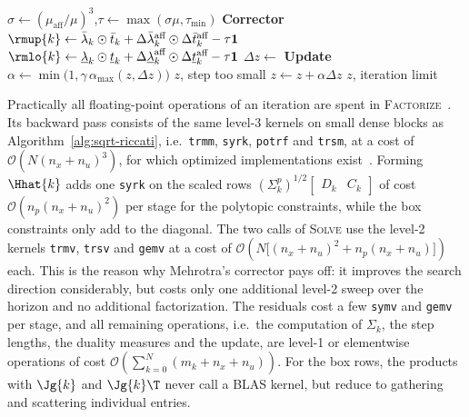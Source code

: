 \begin{algorithm}[H]
\begin{algorithmic}[1]
\State $\sigma \gets (\mu_{\text{aff}} / \mu)^3$,\quad $\tau \gets \max(\sigma\mu, \tau_{\min})$
\Statex \hspace{\algorithmicindent}\textbf{Corrector}
\State $\rmup{k} \gets \bar{\lambda}_k \odot \bar{t}_k + \Delta\bar{\lambda}_k^{\text{aff}} \odot \Delta\bar{t}_k^{\text{aff}} - \tau\mathbf{1}$
\State $\rmlo{k} \gets \underline{\lambda}_k \odot \underline{t}_k + \Delta\underline{\lambda}_k^{\text{aff}} \odot \Delta\underline{t}_k^{\text{aff}} - \tau\mathbf{1}$
\State $\Delta z \gets$ 
\Statex \hspace{\algorithmicindent}\textbf{Update}
\State $\alpha \gets \min\big(1, \gamma\, \alpha_{\max}(z, \Delta z)\big)$
\If{$\alpha < \alpha_{\min}$}
\State \Return $z$, step too small
\EndIf
\State $z \gets z + \alpha \Delta z$
\EndFor
\State \Return $z$, iteration limit
\end{algorithmic}
\end{algorithm}

Practically all floating-point operations of an iteration are spent in \textsc{Factorize}~\cite{frison2020hpipm}.
Its backward pass consists of the same level-3 kernels on small dense blocks as Algorithm~\ref{alg:sqrt-riccati}, i.e.\ \texttt{trmm}, \texttt{syrk}, \texttt{potrf} and \texttt{trsm}, at a cost of $\mathcal{O}\!\left(N (n_x + n_u)^3\right)$, for which optimized implementations exist~\cite{frison2018blasfeo}.
Forming $\Hhat{k}$ adds one \texttt{syrk} on the scaled rows $(\Sigma_k^{p})^{1/2}\begin{bmatrix} D_k & C_k \end{bmatrix}$ of cost $\mathcal{O}\!\left(n_p (n_x + n_u)^2\right)$ per stage for the polytopic constraints, while the box constraints only add to the diagonal.
The two calls of \textsc{Solve} use the level-2 kernels \texttt{trmv}, \texttt{trsv} and \texttt{gemv} at a cost of $\mathcal{O}\!\left(N \big[(n_x + n_u)^2 + n_p (n_x + n_u)\big]\right)$ each.
This is the reason why Mehrotra's corrector pays off: it improves the search direction considerably, but costs only one additional level-2 sweep over the horizon and no additional factorization.
The residuals cost a few \texttt{symv} and \texttt{gemv} per stage, and all remaining operations, i.e.\ the computation of $\Sigma_k$, the step lengths, the duality measures and the update, are level-1 or elementwise operations of cost $\mathcal{O}\!\left(\sum_{k=0}^{N} (m_k + n_x + n_u)\right)$.
For the box rows, the products with $\Jg{k}$ and $\Jg{k}\T$ never call a BLAS kernel, but reduce to gathering and scattering individual entries.

\newpage
